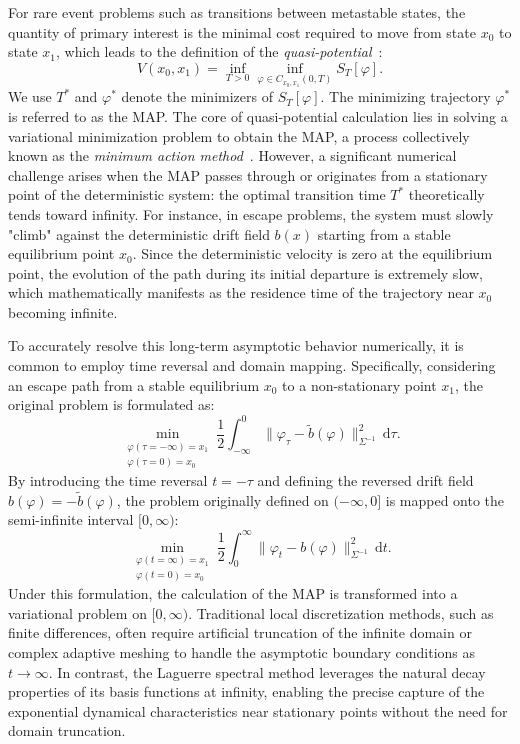 \documentclass[a4paper,fleqn, 12pt]{cas-sc}
\newcommand{\diff}{\,\mathrm{d}}
\numberwithin{table}{section}
\begin{document}
For rare event problems such as transitions between metastable states, the quantity of primary interest is the minimal cost required to move from state $x_0$ to state $x_1$, which leads to the definition of the \emph{quasi-potential}~{\cite{freidlin_random_2012}}:
\begin{equation} \label{eq:Quai-Potential}
V(x_0,x_1)
= \inf_{T>0}
\inf_{\varphi \in C_{x_0,x_1}(0,T)}
S_T[\varphi].
\end{equation}
We use $T^{\ast}$ and $\varphi^{\ast}$ denote the minimizers of $S_T[\varphi]$. The minimizing trajectory $\varphi^*$ is referred to as the MAP. The core of quasi-potential calculation lies in solving a variational minimization problem to obtain the MAP, a process collectively known as the \textit{minimum action method}~\cite{e_minimum_2004}. However, a significant numerical challenge arises when the MAP passes through or originates from a stationary point of the deterministic system: the optimal transition time $T^*$ theoretically tends toward infinity. For instance, in escape problems, the system must slowly "climb" against the deterministic drift field $b(x)$ starting from a stable equilibrium point $x_0$. Since the deterministic velocity is zero at the equilibrium point, the evolution of the path during its initial departure is extremely slow, which mathematically manifests as the residence time of the trajectory near $x_0$ becoming infinite.

To accurately resolve this long-term asymptotic behavior numerically, it is common to employ time reversal and domain mapping. Specifically, considering an escape path from a stable equilibrium $x_0$ to a non-stationary point $x_1$, the original problem is formulated as:
\[
    \min_{\substack{\varphi(\tau = -\infty) = x_1 \\ \varphi(\tau = 0) = x_0}} \frac{1}{2} \int_{-\infty}^{0} \|\varphi_{\tau} - \tilde{b}(\varphi)\|_{\Sigma^{-1}}^2 \diff\tau.
\]
By introducing the time reversal $t = -\tau$ and defining the reversed drift field $b(\varphi) = -\tilde{b}(\varphi)$, the problem originally defined on $(-\infty, 0]$ is mapped onto the semi-infinite interval $[0, \infty)$:
\[
    \min_{\substack{\varphi(t = \infty) = x_1 \\ \varphi(t = 0) = x_0}} \frac{1}{2} \int_{0}^{\infty} \|\varphi_t - b(\varphi)\|_{\Sigma^{-1}}^2 \diff t.
\]
Under this formulation, the calculation of the MAP is transformed into a variational problem on $[0, \infty)$. Traditional local discretization methods, such as finite differences, often require artificial truncation of the infinite domain or complex adaptive meshing to handle the asymptotic boundary conditions as $t \to \infty$. In contrast, the Laguerre spectral method leverages the natural decay properties of its basis functions at infinity, enabling the precise capture of the exponential dynamical characteristics near stationary points without the need for domain truncation.
\end{document}
